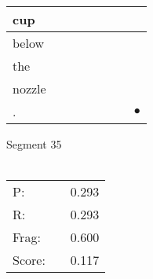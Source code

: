 \documentclass[landscape]{article}
\newcommand{\ssp}{\hspace{2pt}}
\newcommand{\mex}{\cellcolor{g}$\bullet$}
\begin{document}
\begin{tabular}{|l|p{10pt}|p{10pt}|p{10pt}|p{10pt}|p{10pt}|p{10pt}|p{10pt}|}
\hline
\ssp cup \ssp&\hspace{2pt}&\hspace{2pt}&\hspace{2pt}&\hspace{2pt}&\hspace{2pt}&\hspace{2pt}&\hspace{2pt}\\
\hline
\ssp below \ssp&\hspace{2pt}&\hspace{2pt}&\hspace{2pt}&\hspace{2pt}&\hspace{2pt}&\hspace{2pt}&\hspace{2pt}\\
\hline
\ssp the \ssp&\hspace{2pt}&\hspace{2pt}&\hspace{2pt}&\hspace{2pt}&\hspace{2pt}&\hspace{2pt}&\hspace{2pt}\\
\hline
\ssp nozzle \ssp&\hspace{2pt}&\hspace{2pt}&\hspace{2pt}&\hspace{2pt}&\hspace{2pt}&\hspace{2pt}&\hspace{2pt}\\
\hline
\ssp \cellcolor{ref6}. \ssp&\hspace{2pt}&\hspace{2pt}&\hspace{2pt}&\hspace{2pt}&\hspace{2pt}&\hspace{2pt}&\hspace{2pt}\mex\\
\hline
\end{tabular}

\vspace{6pt}
\noindent Segment 35\\\\
\noindent\begin{tabular}{lm{12pt}r}
\hline
P:&&0.293\\
R:&&0.293\\
Frag:&&0.600\\
Score:&&0.117\\
\end{tabular}
\end{document}
